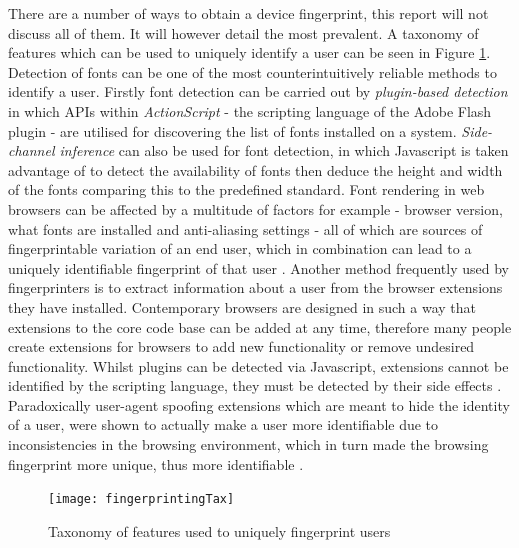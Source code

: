 \documentclass[12pt]{article}
\begin{document}
There are a number of ways to obtain a device fingerprint, this report will not discuss all of them. It will however detail the most prevalent. A taxonomy of features which can be used to uniquely identify a user can be seen in Figure \ref{fig:fingerprintingTax}. Detection of fonts can be one of the most counterintuitively reliable methods to identify a user. Firstly font detection can be carried out by \textit{plugin-based detection} in which APIs within \textit{ActionScript} - the scripting language of the Adobe Flash plugin - are utilised for discovering the list of fonts installed on a system. \textit{Side-channel inference} can also be used for font detection, in which Javascript is taken advantage of to detect the availability of fonts then deduce the height and width of the fonts comparing this to the predefined standard. Font rendering in web browsers can be affected by a multitude of factors for example - browser version, what fonts are installed and anti-aliasing settings - all of which are sources of fingerprintable variation of an end user, which in combination can lead to a uniquely identifiable fingerprint of that user \parencite{fingerprintFonts}. Another method frequently used by fingerprinters is to extract information about a user from the browser extensions they have installed. Contemporary browsers are designed in such a way that extensions to the core code base can be added at any time, therefore many people create extensions for browsers to add new functionality or remove undesired functionality. Whilst plugins can be detected via Javascript, extensions cannot be identified by the scripting language, they must be detected by their side effects \parencite{dustingFP}. Paradoxically user-agent spoofing extensions which are meant to hide the identity of a user, were shown to actually make a user more identifiable due to inconsistencies in the browsing environment, which in turn made the browsing fingerprint more unique, thus more identifiable  \parencite{cookielessMonster}. \\

\begin{figure}[H]
    \centering
    \texttt{[image: fingerprintingTax]}
    \caption{Taxonomy of features used to uniquely fingerprint users \parencite{cookielessMonster}}
    \label{fig:fingerprintingTax}
\end{figure}
\end{document}
